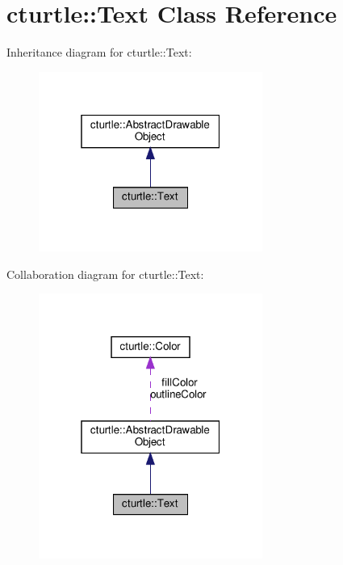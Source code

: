 \hypertarget{classcturtle_1_1Text}{}\section{cturtle\+:\+:Text Class Reference}
\label{classcturtle_1_1Text}


Inheritance diagram for cturtle\+:\+:Text\+:
\nopagebreak
\begin{figure}[H]
\begin{center}
\leavevmode
\includegraphics[width=208pt]{classcturtle_1_1Text__inherit__graph}
\end{center}
\end{figure}


Collaboration diagram for cturtle\+:\+:Text\+:
\nopagebreak
\begin{figure}[H]
\begin{center}
\leavevmode
\includegraphics[width=208pt]{classcturtle_1_1Text__coll__graph}
\end{center}
\end{figure}
